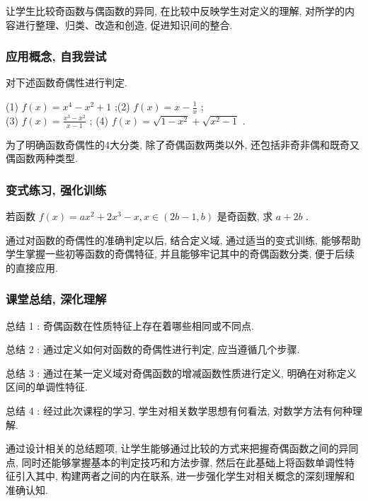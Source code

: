 \begin{purpose}
	让学生比较奇函数与偶函数的异同, 在比较中反映学生对定义的理解, 对所学的内容进行整理、归类、改造和创造, 促进知识间的整合.
\end{purpose}

\subsubsection{应用概念, 自我尝试}
\begin{exercise}
	对下述函数奇偶性进行判定.

	(1) $f(x)=x^{4}-x^{2}+1$ ;(2) $f(x)=x-\frac{1}{x}$ ; \\
	(3)  $f(x)=\frac{x^{3}-x^{2}}{x-1}$ ; (4) $f(x)=\sqrt{1-x^{2}}+\sqrt{x^{2}-1}$ .
\end{exercise}
\begin{purpose}
	为了明确函数奇偶性的4大分类, 除了奇偶函数两类以外, 还包括非奇非偶和既奇又偶函数两种类型.
\end{purpose}

\subsubsection{变式练习, 强化训练}
\begin{exercise}
	若函数 $f(x)=a x^{2}+2 x^{3}-x, x \in(2 b-1, b)$ 是奇函数, 求 $a+2b$ .
\end{exercise}
\begin{purpose}
	通过对函数的奇偶性的准确判定以后, 结合定义域, 通过适当的变式训练, 能够帮助学生掌握一些初等函数的奇偶特征, 并且能够牢记其中的奇偶函数分类, 便于后续的直接应用.
\end{purpose}

\subsubsection{课堂总结, 深化理解}

总结 1 : 奇偶函数在性质特征上存在着哪些相同或不同点.

总结 2 : 通过定义如何对函数的奇偶性进行判定, 应当遵循几个步骤.

总结 3 : 通过在某一定义域对奇偶函数的增减函数性质进行定义, 明确在对称定义区间的单调性特征.

总结 4 : 经过此次课程的学习, 学生对相关数学思想有何看法, 对数学方法有何种理解.

\begin{purpose}
	通过设计相关的总结题项, 让学生能够通过比较的方式来把握奇偶函数之间的异同点, 同时还能够掌握基本的判定技巧和方法步骤, 然后在此基础上将函数单调性特征引入其中, 构建两者之间的内在联系, 进一步强化学生对相关概念的深刻理解和准确认知.
\end{purpose}


